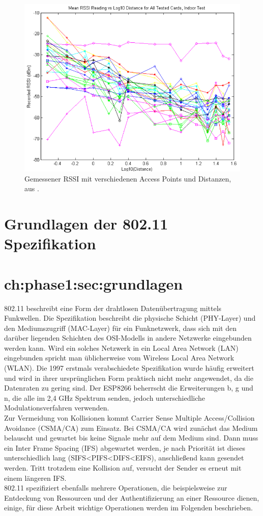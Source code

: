 \begin{figure}[h]
  \centering
	\includegraphics[width=\textwidth]{images/luiRSSI.png}
  \caption{Gemessener RSSI mit verschiedenen Access Points und Distanzen, aus \cite{lui2011differences}.}
  \label{fig:luiRSSI}
\end{figure}

\section{Grundlagen der 802.11 Spezifikation}
\section{ch:phase1:sec:grundlagen}
802.11 beschreibt eine Form der drahtlosen Datenübertragung mittels Funkwellen.
Die Spezifikation beschreibt die physische Schicht (PHY-Layer) und den Mediumszugriff (MAC-Layer) für ein Funknetzwerk, dass sich mit den darüber liegenden Schichten des OSI-Modells in andere Netzwerke eingebunden werden kann.
Wird ein solches Netzwerk in ein Local Area Network (LAN) eingebunden spricht man üblicherweise vom Wireless Local Area Network (WLAN).
Die 1997 erstmals verabschiedete Spezifikation wurde häufig erweitert und wird in ihrer ursprünglichen Form praktisch nicht mehr angewendet, da die Datenraten zu gering sind.
Der ESP8266 beherrscht die Erweiterungen b, g und n, die alle im 2,4 GHz Spektrum senden, jedoch unterschiedliche Modulationsverfahren verwenden.\\
Zur Vermeidung von Kollisionen kommt Carrier Sense Multiple Access/Collision Avoidance (CSMA/CA) zum Einsatz.
Bei CSMA/CA wird zunächst das Medium belauscht und gewartet bis keine Signale mehr auf dem Medium sind. 
Dann muss ein Inter Frame Spacing (IFS) abgewartet werden, je nach Priorität ist dieses unterschiedlich lang (SIFS<PIFS<DIFS<EIFS), anschließend kann gesendet werden.
Tritt trotzdem eine Kollision auf, versucht der Sender es erneut mit einem längeren IFS.\\
802.11 spezifiziert ebenfalls mehrere Operationen, die beispielsweise zur Entdeckung von Ressourcen und der Authentifizierung an einer Ressource dienen, einige, für diese Arbeit wichtige Operationen werden im Folgenden beschrieben.

